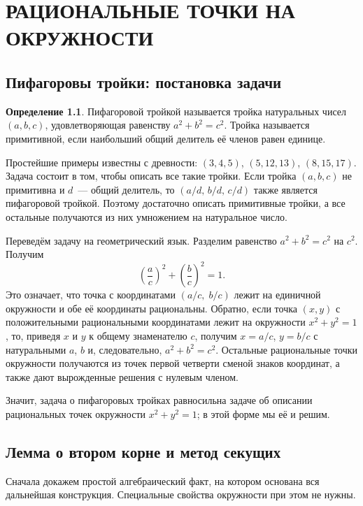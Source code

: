 \documentclass[a4paper,14pt]{extreport}
\theoremstyle{definition}
\newtheorem{defn}[thm]{Определение}
\begin{document}
\chapter{РАЦИОНАЛЬНЫЕ ТОЧКИ НА ОКРУЖНОСТИ}

\section{Пифагоровы тройки: постановка задачи}

\begin{defn}
Пифагоровой тройкой называется тройка натуральных чисел $(a,b,c)$,
удовлетворяющая равенству $a^2+b^2=c^2$. Тройка называется примитивной, если
наибольший общий делитель её членов равен единице.
\end{defn}

Простейшие примеры известны с древности: $(3,4,5)$, $(5,12,13)$, $(8,15,17)$.
Задача состоит в том, чтобы описать все такие тройки. Если тройка $(a,b,c)$
не примитивна и $d$~--- общий делитель, то $(a/d,\,b/d,\,c/d)$ также является
пифагоровой тройкой. Поэтому достаточно описать примитивные тройки, а все
остальные получаются из них умножением на натуральное число.

Переведём задачу на геометрический язык. Разделим равенство $a^2+b^2=c^2$ на $c^2$. Получим
\[
  \left(\frac{a}{c}\right)^{\!2}+\left(\frac{b}{c}\right)^{\!2}=1 .
\]
Это означает, что точка с координатами $(a/c,\;b/c)$ лежит на единичной
окружности и обе её координаты рациональны. Обратно, если точка $(x,y)$ с
положительными рациональными координатами лежит на окружности $x^2+y^2=1$, то,
приведя $x$ и $y$ к общему знаменателю $c$, получим $x=a/c$, $y=b/c$ с
натуральными $a$, $b$ и, следовательно, $a^2+b^2=c^2$. Остальные рациональные
точки окружности получаются из точек первой четверти сменой знаков координат,
а также дают вырожденные решения с нулевым членом.

Значит, задача о пифагоровых тройках равносильна задаче об описании
рациональных точек окружности $x^2+y^2=1$; в этой форме мы её и решим.

\section{Лемма о втором корне и метод секущих}

Сначала докажем простой алгебраический факт, на котором основана вся
дальнейшая конструкция. Специальные свойства окружности при этом не нужны.
\end{document}

